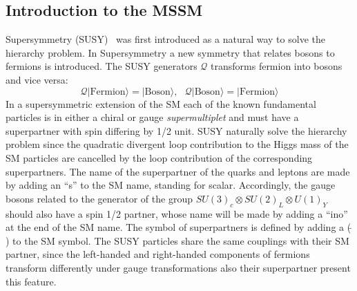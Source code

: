 \subsection{Introduction to the MSSM}
Supersymmetry (SUSY)~\cite{Susy1,Susy2,Susy3} was first introduced as a natural way to solve the hierarchy problem.
In Supersymmetry a new symmetry that relates bosons to fermions is introduced.
The SUSY generators $\mathcal{Q}$ transforms fermion into bosons and vice versa:
\begin{equation}
\mathcal{Q}|\text{Fermion}\rangle = |\text{Boson}\rangle, ~ ~ ~ \mathcal{Q}|\text{Boson}\rangle = |\text{Fermion}\rangle
\end{equation}
In a supersymmetric extension of the SM  each of the known fundamental particles 
is in either a chiral or gauge \emph{supermultiplet} and must have a superpartner with spin differing by 1/2 unit.
SUSY naturally solve the hierarchy problem since the quadratic divergent loop contribution to the Higgs mass of the SM 
particles are cancelled by the loop contribution of the corresponding superpartners. 
The name of the superpartner of the quarks and leptons are made by adding an ``s'' to the SM name, standing for scalar.
Accordingly, the gauge bosons related to the generator of the group $SU(3)_c \otimes SU(2)_L \otimes U(1)_Y$ should also have a spin 1/2 partner,
whose name will be made by adding a ``ino'' at the end of the SM name. The symbol of superpartners is defined by adding a ($\tilde{ ~ }$) to the SM symbol.
The SUSY particles share the same couplings with their SM partner, since the left-handed and right-handed components of fermions 
transform differently under gauge transformations also their superpartner present this feature.

